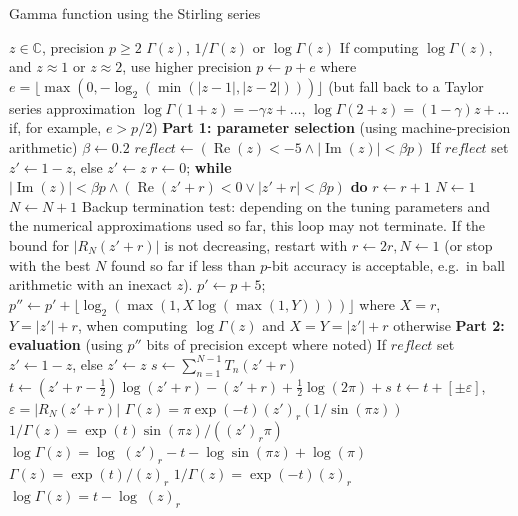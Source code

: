 \documentclass[reqno]{amsart}
\newcommand{\Real}{\operatorname{Re}}
\newcommand{\Imag}{\operatorname{Im}}
\newcommand{\CC}{\mathbb{C}}
\theoremstyle{definition}
\begin{document}
\begin{algorithm}%
\caption{Gamma function using the Stirling series}\label{alg:stirling}
\small
\begin{algorithmic}[1]
\Require $z \in \CC$, precision $p \ge 2$
\Ensure $\Gamma(z)$, $1/\Gamma(z)$ or $\log \Gamma(z)$
\State If computing $\log \Gamma(z)$, and $z \approx 1$ or $z \approx 2$, use higher precision $p \gets p + e$ where $e = \lfloor \max(0, -\log_2(\min(|z-1|, |z-2|))) \rfloor$ (but fall back to a Taylor series approximation $\log \Gamma(1+z) = -\gamma z + \ldots$, $\log \Gamma(2+z) = (1-\gamma) z + \ldots$ if, for example, $e > p/2$)
\State \textbf{Part 1: parameter selection} (using machine-precision arithmetic)
\State $\beta \gets 0.2$     
\State $\textit{reflect} \gets (\operatorname{Re}(z) < -5 \land |\Imag(z)| < \beta p)$ 
\State If $\textit{reflect}$ set $z' \gets 1 - z$, else $z' \gets z$
\State $r \gets 0$; \textbf{while} $|\Imag(z)| < \beta p \land (\Real(z'+r) < 0 \lor |z'+r| < \beta p)$ \textbf{do} $r \gets r + 1$
\State $N \gets 1$
 
    \State $N \gets N + 1$
    \State Backup termination test: depending on the tuning parameters and the numerical approximations used so far, this loop may not terminate. If the bound for $|R_{N}(z'+r)|$ is not decreasing, restart with $r \gets 2r, N \gets 1$ (or stop with the best $N$ found so far if less than $p$-bit accuracy is acceptable, e.g.\ in ball arithmetic with an inexact $z$).
\EndWhile
\State $p' \gets p + 5$; \quad $p'' \gets p' + \lfloor \log_2(\max(1, X \log(\max(1, Y)))) \rfloor$ where $X = r$, $Y = |z'| + r$,  when computing $\log \Gamma(z)$ and $X = Y = |z'|+r$ otherwise
\State \textbf{Part 2: evaluation} (using $p''$ bits of precision except where noted)
\State If $\textit{reflect}$ set $z' \gets 1 - z$, else $z' \gets z$
\State $s \gets \sum_{n=1}^{N-1} T_n(z'+r)$  
\State $t \gets (z'+r-\tfrac{1}{2}) \log(z'+r) - (z'+r) + \tfrac{1}{2}\log(2 \pi) + s$
\State $t \gets t + [\pm \varepsilon]$, $\varepsilon = |R_N(z'+r)|$ 
\State \Return $\Gamma(z) = \pi \exp(-t) (z')_r  (1 / \sin(\pi z))$
\State \Return $1/\Gamma(z) = \exp(t) \sin(\pi z) / ((z')_r \pi)$
\State \Return $\log \Gamma(z) = \log \; (z')_r - t - \log \sin(\pi z) + \log(\pi)$
\Else
\State \Return $\Gamma(z) = \exp(t) / (z)_r$
\State \Return $1/\Gamma(z) = \exp(-t) (z)_r$
\State \Return $\log \Gamma(z) = t - \log \; (z)_r$
\EndIf
\end{algorithmic}
\end{algorithm}
\end{document}
